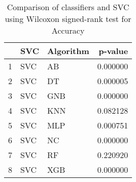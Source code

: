 \begin{table}
\footnotesize
\caption{Comparison of classifiers and SVC using Wilcoxon signed-rank test for Accuracy}
\label{tab:SVC wilcoxon Accuracy comparison}
\begin{tabular}{lllr}
\hline
 & SVC & Algorithm & p-value \\
\hline
1 & SVC & AB & 0.000000 \\
2 & SVC & DT & 0.000005 \\
3 & SVC & GNB & 0.000000 \\
4 & SVC & KNN & 0.082128 \\
5 & SVC & MLP & 0.000751 \\
6 & SVC & NC & 0.000000 \\
7 & SVC & RF & 0.220920 \\
8 & SVC & XGB & 0.000000 \\
\hline
\end{tabular}
\end{table}
